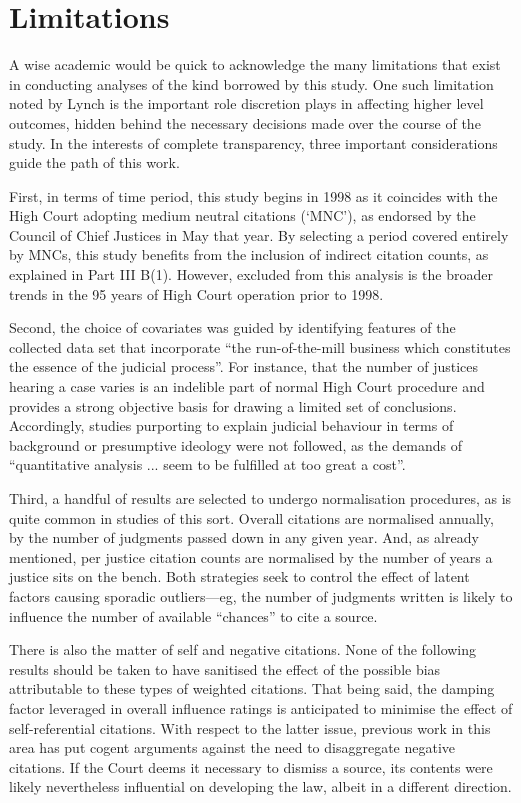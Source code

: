 \let\xn\xnote
\section{Limitations}

A wise academic would be quick to acknowledge the many limitations that exist in conducting analyses of the kind borrowed by this study. One such limitation noted by Lynch is the important role discretion plays in affecting higher level outcomes, hidden behind the necessary decisions made over the course of the study.\xn{4-1} In the interests of complete transparency, three important considerations guide the path of this work.

First, in terms of time period, this study begins in 1998 as it coincides with the High Court adopting medium neutral citations (`MNC'), as endorsed by the Council of Chief Justices in May that year.\xn{4-2} By selecting a period covered entirely by MNCs, this study benefits from the inclusion of indirect citation counts, as explained in Part III B(1). However, excluded from this analysis is the broader trends in the 95 years of High Court operation prior to 1998.

Second, the choice of covariates was guided by identifying features of the collected data set that incorporate ``the run-of-the-mill business which constitutes the essence of the judicial process''.\xn{4-3} For instance, that the number of justices hearing a case varies is an indelible part of normal High Court procedure and provides a strong objective basis for drawing a limited set of conclusions. Accordingly, studies purporting to explain judicial behaviour in terms of background or presumptive ideology were not followed, as the demands of ``quantitative analysis ... seem to be fulfilled at too great a cost''.\xn{4-4}

Third, a handful of results are selected to undergo normalisation procedures, as is quite common in studies of this sort.\xn{4-5} Overall citations are normalised annually, by the number of judgments passed down in any given year. And, as already mentioned, per justice citation counts are normalised by the number of years a justice sits on the bench. Both strategies seek to control the effect of latent factors causing sporadic outliers---eg, the number of judgments written is likely to influence the number of available ``chances'' to cite a source.

There is also the matter of self and negative citations.\xn{4-6} None of the following results should be taken to have sanitised the effect of the possible bias attributable to these types of weighted citations. That being said, the damping factor leveraged in overall influence ratings is anticipated to minimise the effect of self-referential citations. With respect to the latter issue, previous work in this area has put cogent arguments against the need to disaggregate negative citations.\xn{4-7} If the Court deems it necessary to dismiss a source, its contents were likely nevertheless influential on developing the law, albeit in a different direction.\xn{4-8}

